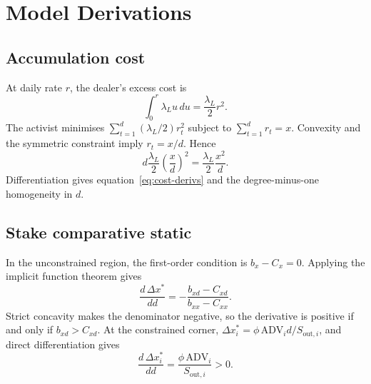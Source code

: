 \appendix
\section{Model Derivations}
\label{app:model-derivations}

\subsection{Accumulation cost}

At daily rate $r$, the dealer's excess cost is
\[
\int_0^r\lambda_Lu\,du=\frac{\lambda_L}{2}r^2.
\]
The activist minimises
$\sum_{t=1}^d(\lambda_L/2)r_t^2$ subject to
$\sum_{t=1}^dr_t=x$. Convexity and the symmetric constraint imply
$r_t=x/d$. Hence
\[
d\frac{\lambda_L}{2}\left(\frac{x}{d}\right)^2
=\frac{\lambda_L}{2}\frac{x^2}{d}.
\]
Differentiation gives equation~\eqref{eq:cost-derivs} and the degree-minus-one
homogeneity in $d$.

\subsection{Stake comparative static}

In the unconstrained region, the first-order condition is $b_x-C_x=0$.
Applying the implicit function theorem gives
\[
\frac{d\,\Delta x^\ast}{dd}
=-\frac{b_{xd}-C_{xd}}{b_{xx}-C_{xx}}.
\]
Strict concavity makes the denominator negative, so the derivative is positive
if and only if $b_{xd}>C_{xd}$. At the constrained corner,
$\Delta x_i^\ast=\phi\,\mathrm{ADV}_i d/S_{\mathrm{out},i}$, and direct
differentiation gives
\[
\frac{d\,\Delta x_i^\ast}{dd}
=\frac{\phi\,\mathrm{ADV}_i}{S_{\mathrm{out},i}}>0.
\]

